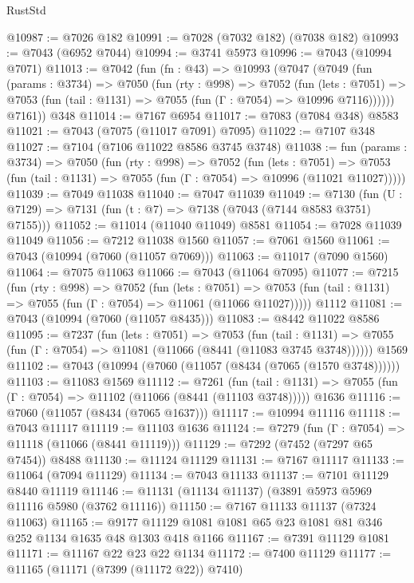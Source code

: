 \begin{lexlean}{RustStd}
\begin{coremodule}
@10987 := @7026 @182
@10991 := @7028 (@7032 @182) (@7038 @182)
@10993 := @7043 (@6952 @7044)
@10994 := @3741 @5973
@10996 := @7043 (@10994 @7071)
@11013 := @7042
    (fun (fn : @43) =>
    @10993
      (@7047
        (@7049
          (fun (params : @3734) =>
          @7050
            (fun (rty : @998) =>
            @7052
              (fun (lets : @7051) =>
              @7053 (fun (tail : @1131) => @7055 (fun (Γ : @7054) => @10996 @7116))))))
        @7161))
    @348
@11014 := @7167 @6954
@11017 := @7083 (@7084 @348) @8583
@11021 := @7043 (@7075 (@11017 @7091) @7095)
@11022 := @7107 @348
@11027 := @7104 (@7106 @11022 @8586 @3745 @3748)
@11038 := fun (params : @3734) =>
  @7050
    (fun (rty : @998) =>
    @7052
      (fun (lets : @7051) =>
      @7053 (fun (tail : @1131) => @7055 (fun (Γ : @7054) => @10996 (@11021 @11027)))))
@11039 := @7049 @11038
@11040 := @7047 @11039
@11049 := @7130 (fun (U : @7129) => @7131 (fun (t : @7) => @7138 (@7043 (@7144 @8583 @3751) @7155)))
@11052 := @11014 (@11040 @11049) @8581
@11054 := @7028 @11039 @11049
@11056 := @7212 @11038 @1560
@11057 := @7061 @1560
@11061 := @7043 (@10994 (@7060 (@11057 @7069)))
@11063 := @11017 (@7090 @1560)
@11064 := @7075 @11063
@11066 := @7043 (@11064 @7095)
@11077 := @7215
    (fun (rty : @998) =>
    @7052
      (fun (lets : @7051) =>
      @7053 (fun (tail : @1131) => @7055 (fun (Γ : @7054) => @11061 (@11066 @11027)))))
    @1112
@11081 := @7043 (@10994 (@7060 (@11057 @8435)))
@11083 := @8442 @11022 @8586
@11095 := @7237
    (fun (lets : @7051) =>
    @7053
      (fun (tail : @1131) =>
      @7055 (fun (Γ : @7054) => @11081 (@11066 (@8441 (@11083 @3745 @3748))))))
    @1569
@11102 := @7043 (@10994 (@7060 (@11057 (@8434 (@7065 (@1570 @3748))))))
@11103 := @11083 @1569
@11112 := @7261
    (fun (tail : @1131) => @7055 (fun (Γ : @7054) => @11102 (@11066 (@8441 (@11103 @3748)))))
    @1636
@11116 := @7060 (@11057 (@8434 (@7065 @1637)))
@11117 := @10994 @11116
@11118 := @7043 @11117
@11119 := @11103 @1636
@11124 := @7279 (fun (Γ : @7054) => @11118 (@11066 (@8441 @11119)))
@11129 := @7292 (@7452 (@7297 @65 @7454)) @8488
@11130 := @11124 @11129
@11131 := @7167 @11117
@11133 := @11064 (@7094 @11129)
@11134 := @7043 @11133
@11137 := @7101 @11129 @8440 @11119
@11146 := @11131 (@11134 @11137) (@3891 @5973 @5969 @11116 @5980 (@3762 @11116))
@11150 := @7167 @11133 @11137 (@7324 @11063)
@11165 := @9177 @11129 @1081 @1081 @65 @23 @1081 @81 @346 @252 @1134 @1635 @48 @1303 @418 @1166
@11167 := @7391 @11129 @1081
@11171 := @11167 @22 @23 @22 @1134
@11172 := @7400 @11129
@11177 := @11165 (@11171 (@7399 (@11172 @22)) @7410)

\end{coremodule}
\end{lexlean}
